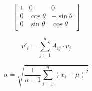 \documentclass[12pt]{article}
\begin{document}
$$
\begin{bmatrix}
1 & 0 & 0 \\
0 & \cos \theta & -\sin \theta \\
0 & \sin \theta  & \cos \theta \\
\end{bmatrix}
$$

$$
v'_i = \sum_{j = 1}^n A_{ij}\cdot v_j
$$

$$
\sigma = \sqrt{\frac{1}{n - 1}\sum_{i = 1}^n (x_i - \mu)^2}
$$
\end{document}
